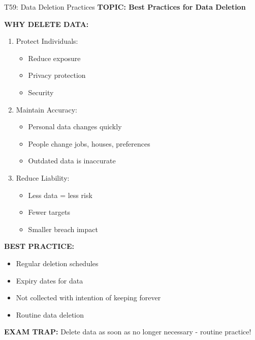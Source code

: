 \documentclass[8pt]{beamer}
\begin{document}
	\begin{frame}{T59: Data Deletion Practices}
		\fontsize{6.5}{7.5}\selectfont
		\textbf{TOPIC: Best Practices for Data Deletion}
		
		\vspace{0.1cm}
		\textbf{WHY DELETE DATA:}
		\begin{enumerate}
			\item \textcolor{myblue}{Protect Individuals:}
			\begin{itemize}
				\item Reduce exposure
				\item Privacy protection
				\item Security
			\end{itemize}
			\item \textcolor{myblue}{Maintain Accuracy:}
			\begin{itemize}
				\item Personal data changes quickly
				\item People change jobs, houses, preferences
				\item Outdated data is inaccurate
			\end{itemize}
			\item \textcolor{myblue}{Reduce Liability:}
			\begin{itemize}
				\item Less data = less risk
				\item Fewer targets
				\item Smaller breach impact
			\end{itemize}
		\end{enumerate}
		
		\vspace{0.1cm}
		\textbf{BEST PRACTICE:}
		\begin{itemize}
			\item Regular deletion schedules
			\item Expiry dates for data
			\item Not collected with intention of keeping forever
			\item Routine data deletion
		\end{itemize}
		
		\textcolor{myred}{\textbf{EXAM TRAP:}} Delete data \textcolor{myblue}{as soon as no longer necessary} - routine practice!
	\end{frame}
	
\end{document}

